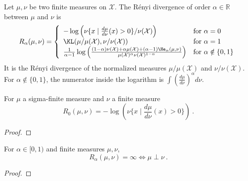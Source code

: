 \begin{definition}
  \label{def:Renyi}
  \leanok
  Let $\mu, \nu$ be two finite measures on $\mathcal X$. The Rényi divergence of order $\alpha \in \mathbb{R}$ between $\mu$ and $\nu$ is
  \begin{align*}
  R_\alpha(\mu, \nu) = \left\{
 \begin{array}{ll}
  - \log \left( \nu\{x \mid \frac{d \mu}{d \nu}(x) > 0\} / \nu(\mathcal X) \right) & \text{for } \alpha = 0
  \\
  \KL(\mu / \mu(\mathcal X), \nu / \nu(\mathcal X)) & \text{for } \alpha = 1
  \\
  \frac{1}{\alpha - 1} \log \left( \frac{(1 - \alpha) \nu(\mathcal X) + \alpha \mu(\mathcal X) + (\alpha - 1) \He_\alpha(\mu, \nu)}{\mu(\mathcal X)^\alpha \nu(\mathcal X)^{1 - \alpha}} \right) & \text{for } \alpha \notin \{0, 1\}
  \end{array}\right.
  \end{align*}
  It is the Rényi divergence of the normalized measures $\mu / \mu(\mathcal X)$ and $\nu / \nu(\mathcal X)$. For $\alpha \notin \{0, 1\}$, the numerator inside the logarithm is $\int \left(\frac{d \mu}{d \nu}\right)^\alpha d\nu$.
\end{definition}


\begin{lemma}
  \label{lem:renyiDiv_zero}
  \leanok
  For $\mu$ a sigma-finite measure and $\nu$ a finite measure 
  \[R_0(\mu, \nu) = - \log(\nu\{x \mid \frac{d \mu}{d \nu}(x) > 0\}) \: .\]
\end{lemma}

\begin{proof}\leanok
{}
\end{proof}


\begin{lemma}
  \label{lem:renyiDiv_eq_top_iff_mutuallySingular_of_lt_one}
  \leanok
  For $\alpha \in [0, 1)$ and finite measures $\mu, \nu$, 
  \[R_\alpha(\mu, \nu) = \infty \iff \mu \perp \nu \: .\]
\end{lemma}

\begin{proof}\leanok
{}
\end{proof}


